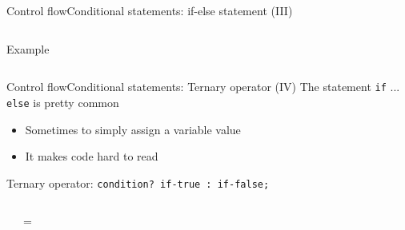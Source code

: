 \documentclass[10pt,compress]{beamer} %
\begin{document}
\begin{frame}{Control flow}{Conditional statements: if-else statement (III)}
	\vspace{-0.4cm}
	\begin{columns}
	\column{\textwidth}
	\small{
	\begin{block}{Example}
		\vspace{-0.25cm}
		
		\vspace{-0.2cm}
	\end{block}
	}
	\end{columns}
\end{frame}

\begin{frame}{Control flow}{Conditional statements: Ternary operator (IV)}
	The statement \texttt{if} ... \texttt{else} is pretty common 
    \begin{itemize}
		\item Sometimes to simply assign a variable value
		\item It makes code hard to read
    \end{itemize}
	Ternary operator: \texttt{condition? if-true : if-false;}
	\vspace{-0.2cm}
    \begin{columns}
	\footnotesize{
		\begin{block}{}
		\vspace{-0.2cm}
		
		\vspace{-0.2cm}
		\end{block}
	}
		\Large{=}
	\footnotesize{
		\begin{block}{}
		\vspace{-0.2cm}
		
		\vspace{-0.2cm}
		\end{block}
	}
	\end{columns}
\end{frame}
\end{document}
